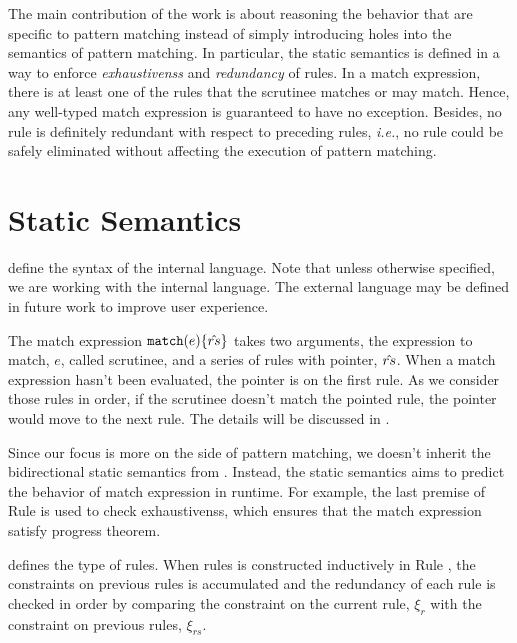 \documentclass[acmsmall,screen,review,nonacm]{acmart}
\begin{document}
The main contribution of the work is about reasoning the behavior that are specific to pattern matching instead of simply introducing holes into the semantics of pattern matching. In particular, the static semantics is defined in a way to enforce \emph{exhaustivenss} and \emph{redundancy} of rules. In a match expression, there is at least one of the rules that the scrutinee matches or may match. Hence, any well-typed match expression is guaranteed to have no exception. Besides, no rule is definitely redundant with respect to preceding rules, \textit{i.e.}, no rule could be safely eliminated without affecting the execution of pattern matching.

\section{Static Semantics}
\label{sec:statics}



 define the syntax of the internal language. Note that unless otherwise specified, we are working with the internal language. The external language may be defined in future work to improve user experience.

The match expression $\mathtt{match}(e) \{\hat{rs}\}$ takes two arguments, the expression to match, $e$, called scrutinee, and a series of rules with pointer, $\hat{rs}$. When a match expression hasn't been evaluated, the pointer is on the first rule. As we consider those rules in order, if the scrutinee doesn't match the pointed rule, the pointer would move to the next rule. The details will be discussed in .



Since our focus is more on the side of pattern matching, we doesn't inherit the bidirectional static semantics from \citet{DBLP:conf/popl/OmarVHAH17}. Instead, the static semantics aims to predict the behavior of match expression in runtime. For example, the last premise of Rule \TMatchZPre is used to check exhaustivenss, which ensures that the match expression satisfy progress theorem.



 defines the type of rules. When rules is constructed inductively in Rule \TRules, the constraints on previous rules is accumulated and the redundancy of each rule is checked in order by comparing the constraint on the current rule, $\xi_r$ with the constraint on previous rules, $\xi_{rs}$.
\end{document}
